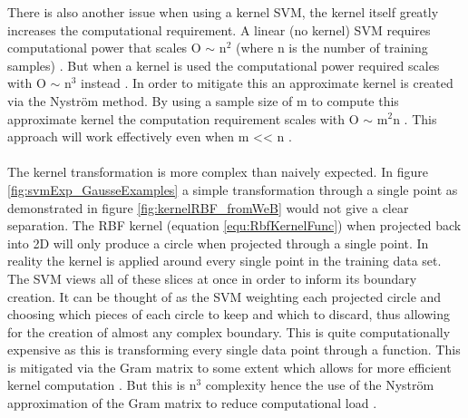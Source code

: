 There is also another issue when using a kernel SVM, the kernel itself greatly increases the computational requirement. A linear (no kernel) SVM requires computational power that scales O $\sim$ n$^2$ (where n is the number of training samples) \cite{cortes1995support}. But when a kernel is used the computational power required scales with O $\sim$ n$^3$ instead \cite{williams2001using}. In order to mitigate this an approximate kernel is created via the Nyström method. By using a sample size of m to compute this approximate kernel the computation requirement scales with O $\sim$ m$^2$n \cite{williams2001using}. This approach will work effectively even when m << n \cite{williams2001using}. 
\\\\The kernel transformation is more complex than naively expected. In figure \ref{fig:svmExp_GausseExamples} a simple transformation through a single point as demonstrated in figure \ref{fig:kernelRBF_fromWeB} would not give a clear separation. The RBF kernel (equation \ref{equ:RbfKernelFunc}) when projected back into 2D will only produce a circle when projected through a single point. In reality the kernel is applied around every single point in the training data set. The SVM views all of these slices at once in order to inform its boundary creation. It can be thought of as the SVM weighting each projected circle and choosing which pieces of each circle to keep and which to discard, thus allowing for the creation of almost any complex boundary. This is quite computationally expensive as this is transforming every single data point through a function. This is mitigated via the Gram matrix to some extent which allows for more efficient kernel computation \cite{williams2001using}. But this is n$^3$ complexity hence the use of the Nyström approximation of the Gram matrix to reduce computational load \cite{williams2001using}. 
